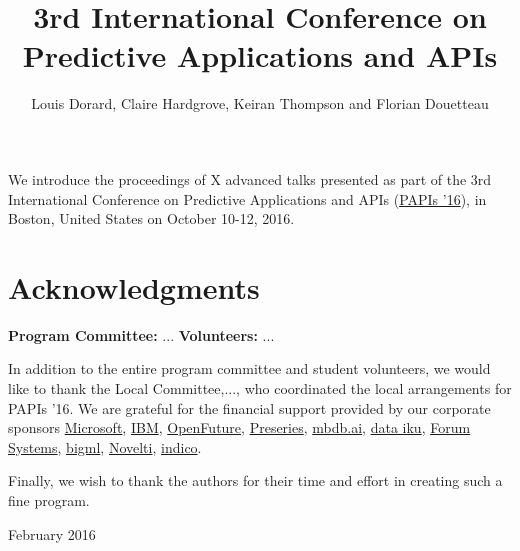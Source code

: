 \documentclass[wcp]{jmlrbook}
\title[PAPIs 2016]{3rd International Conference on Predictive Applications and APIs}
\author{Louis Dorard, Claire Hardgrove, Keiran Thompson and Florian Douetteau}
\subtitle{\thejmlrworkshop}
\begin{document}
\maketitle

\frontmatter

\begin{preface}

	We introduce the proceedings of X advanced talks presented as part of the 3rd International Conference on Predictive Applications and APIs (\href{http://papis.io/2016}{PAPIs '16}), in Boston, United States on October 10-12, 2016.

  \section*{Acknowledgments}

  \textbf{Program Committee:}
  ...
  \textbf{Volunteers:}
  ...

  In addition to the entire program committee and student volunteers, we would like to thank the Local Committee,..., who coordinated the local arrangements for PAPIs '16.
  We are grateful for the financial support provided by our corporate sponsors \href{http://microsoft.com}{Microsoft}, \href{http://ibm.com}{IBM}, \href{http://openfuture.org}{OpenFuture}, \href{http://preseries}{Preseries}, \href{http://mldb.ai}{mbdb.ai}, \href{http://dataiku.com}{data iku}, \href{http://forumsys.com}{Forum Systems}, \href{https://bigml.com}{bigml}, \href{http://novelti.io}{Novelti}, \href{https://indico.io}{indico}.

  Finally, we wish to thank the authors for their time and effort in creating such a fine program.

\begin{signoff}{February 2016}
\end{signoff}


\end{preface}

\tableofcontents

\mainmatter

\begin{jmlrpapers}
\end{jmlrpapers}
\end{document}
